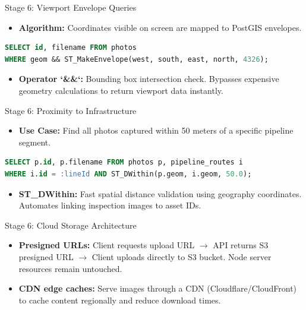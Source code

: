 \documentclass[aspectratio=169]{beamer}
\begin{document}
\begin{frame}[fragile]{Stage 6: Viewport Envelope Queries}
  \begin{itemize}
    \item \textbf{Algorithm:} Coordinates visible on screen are mapped to PostGIS envelopes.
  \end{itemize}
\begin{lstlisting}[language=SQL]
SELECT id, filename FROM photos 
WHERE geom && ST_MakeEnvelope(west, south, east, north, 4326);
\end{lstlisting}
  \begin{itemize}
    \item \textbf{Operator `\&\&`:} Bounding box intersection check. Bypasses expensive geometry calculations to return viewport data instantly.
  \end{itemize}
\end{frame}

\begin{frame}[fragile]{Stage 6: Proximity to Infrastructure}
  \begin{itemize}
    \item \textbf{Use Case:} Find all photos captured within 50 meters of a specific pipeline segment.
  \end{itemize}
\begin{lstlisting}[language=SQL]
SELECT p.id, p.filename FROM photos p, pipeline_routes i
WHERE i.id = :lineId AND ST_DWithin(p.geom, i.geom, 50.0);
\end{lstlisting}
  \begin{itemize}
    \item \textbf{ST\_DWithin:} Fast spatial distance validation using geography coordinates. Automates linking inspection images to asset IDs.
  \end{itemize}
\end{frame}

\begin{frame}{Stage 6: Cloud Storage Architecture}
  \begin{itemize}
    \item \textbf{Presigned URLs:} Client requests upload URL $\to$ API returns S3 presigned URL $\to$ Client uploads directly to S3 bucket. Node server resources remain untouched.
    \item \textbf{CDN edge caches:} Serve images through a CDN (Cloudflare/CloudFront) to cache content regionally and reduce download times.
  \end{itemize}
\end{frame}
\end{document}
